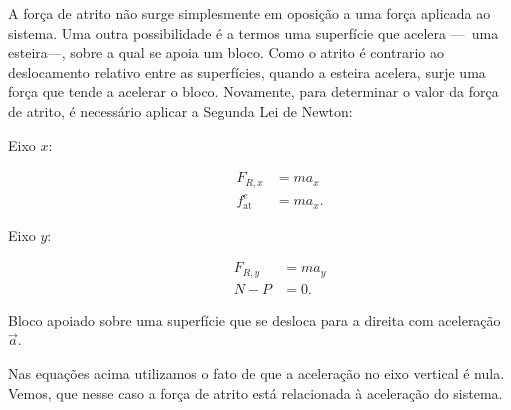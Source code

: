 A força de atrito não surge simplesmente em oposição a uma força aplicada ao sistema. Uma outra possibilidade é a termos uma superfície que acelera ---~uma esteira---, sobre a qual se apoia um bloco. Como o atrito é contrario ao deslocamento relativo entre as superfícies, quando a esteira acelera, surje uma força que tende a acelerar o bloco. Novamente, para determinar o valor da força de atrito, é necessário aplicar a Segunda Lei de Newton:
\begin{description}
    \item[Eixo $x$:]
        \begin{align}
            F_{R, x} &= m a_x \\
            f_{\text{at}}^e &= m a_x.
        \end{align}
    \item[Eixo $y$:]
        \begin{align}
            F_{R, y} &= m a_y \\
            N - P &= 0.
        \end{align}
\end{description}

\begin{marginfigure}
\centering
{}
\caption{Bloco apoiado sobre uma superfície que se desloca para a direita com aceleração $\vec{a}$.}
\end{marginfigure}
%
\noindent{}Nas equações acima utilizamos o fato de que a aceleração no eixo vertical é nula. Vemos, que nesse caso a força de atrito está relacionada à aceleração do sistema.

